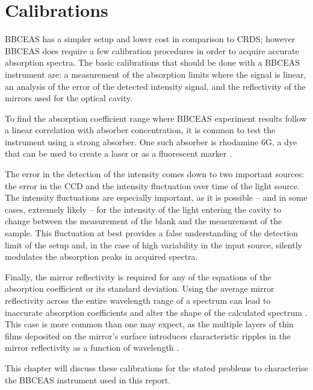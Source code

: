 \chapter{Calibrations}\label{ch:cal}

\acl{BBCEAS} has a simpler setup and lower cost in comparison to \ac{CRDS};
however \ac{BBCEAS} does require a few calibration procedures in order to
acquire accurate absorption spectra. The basic calibrations that should be
done with a \ac{BBCEAS} instrument are: a measurement of the absorption limits
where the signal is linear, an analysis of the error of the detected intensity
signal, and the reflectivity of the mirrors used for the optical cavity.

To find the absorption coefficient range where \ac{BBCEAS} experiment results
follow a linear correlation with absorber concentration, it is common to test
the instrument using a strong absorber. One such absorber is rhodamine 6G,
a dye that can be used to create a laser \cite{Pappalardo:1970hi} or as a
fluorescent marker \cite{Gear:1974tf}.

The error in the detection of the intensity comes down to two important
sources: the error in the \ac{CCD} and the intensity fluctuation over time of
the light source. The intensity fluctuations are especially important, as it
is possible -- and in some cases, extremely likely -- for the intensity of
the light entering the cavity to change between the measurement of the blank
and the measurement of the sample. This fluctuation at best provides a false
understanding of the detection limit of the setup and, in the case of high
variability in the input source, silently modulates the absorption peaks in
acquired spectra.

Finally, the mirror reflectivity is required for any of the equations of the
absorption coefficient or its standard deviation. Using the average mirror
reflectivity across the entire wavelength range of a spectrum can lead to
inaccurate absorption coefficients and alter the shape of the calculated
spectrum \cite{Berden:2009wk}. This case is more common than one may expect,
as the multiple layers of thin films deposited on the mirror's surface
introduces characteristic ripples in the mirror reflectivity as a function of
wavelength \cite{Islam:2007ea}.

This chapter will discuss these calibrations for the stated problems to
characterise the \ac{BBCEAS} instrument used in this report.



